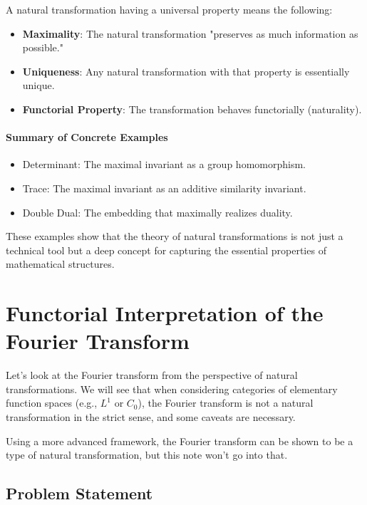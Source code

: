 \documentclass[uplatex,a4j,12pt,dvipdfmx]{jsarticle}
\begin{document}
A natural transformation having a universal property means the following:

\begin{itemize}
	\item \textbf{Maximality}: The natural transformation "preserves as much information as possible."
	\item \textbf{Uniqueness}: Any natural transformation with that property is essentially unique.
	\item \textbf{Functorial Property}: The transformation behaves functorially (naturality).
\end{itemize}

\paragraph{Summary of Concrete Examples}
\begin{itemize}
	\item Determinant: The maximal invariant as a group homomorphism.
	\item Trace: The maximal invariant as an additive similarity invariant.
	\item Double Dual: The embedding that maximally realizes duality.
\end{itemize}

These examples show that the theory of natural transformations is not just a technical tool but a deep concept for capturing the essential properties of mathematical structures.



\section{Functorial Interpretation of the Fourier Transform}

Let's look at the Fourier transform from the perspective of natural transformations.
We will see that when considering categories of elementary function spaces (e.g., $L^{1}$ or $C_{0}$), the Fourier transform is not a natural transformation in the strict sense, and some caveats are necessary.

Using a more advanced framework, the Fourier transform can be shown to be a type of natural transformation, but this note won't go into that.

\subsection{Problem Statement}
\end{document}
